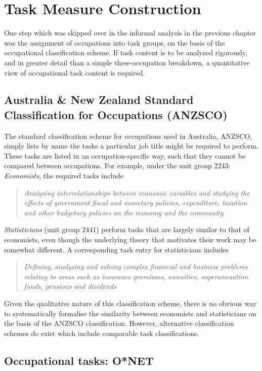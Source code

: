 \chapter{Task Measure Construction}
\label{sec:occclassify}

One step which was skipped over in the informal analysis in the previous chapter was the assignment of occupations into task groups, on the basis of the occupational classification scheme. If task content is to be analyzed rigorously, and in greater detail than a simple three-occupation breakdown, a quantitative view of occupational task content is required. 

\section{Australia \& New Zealand Standard Classification for Occupations (ANZSCO)}

The standard classification scheme for occupations used in Australia, ANZSCO, simply lists by name the tasks a particular job title might be required to perform. These tasks are listed in an occupation-specific way, such that they cannot be compared between occupations. For example, under the unit group 2243: {\em Economists}, the required tasks include
\begin{quote}
{\em Analysing interrelationships between economic variables and studying the effects of government fiscal and monetary policies, expenditure, taxation and other budgetary policies on the economy and the community \citep[p.185]{Trewin2006}}
\end{quote}

{\em Statisticians} (unit group 2441) perform tasks that are largely similar to that of economists, even though the underlying theory that motivates their work may be somewhat different. A corresponding task entry for statisticians includes
\begin{quote}
{\em Defining, analysing and solving complex financial and business problems relating to areas such as insurance premiums, annuities, superannuation funds, pensions and dividends \citep[p.181]{Trewin2006}}
\end{quote}
Given the qualitative nature of this classification scheme, there is no obvious way to systematically formalise the similarity between economists and statisticians on the basis of the ANZSCO classification. However, alternative classification schemes do exist which include comparable task classifications.

\section{Occupational tasks: O*NET}\label{sec:onet}


